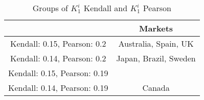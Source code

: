 
\begin{table}[ph]
\centering
\small
\begin{tabular}{ |c|c| }
\hline
& Markets \\
\hline
    Kendall: 0.15, Pearson: 0.2 & Australia, Spain, UK \\ 
 \hline 
Kendall: 0.14, Pearson: 0.2 & Japan, Brazil, Sweden \\ 
 \hline 
Kendall: 0.15, Pearson: 0.19 &  \\ 
 \hline 
Kendall: 0.14, Pearson: 0.19 & Canada \\ 
 \hline 
\end{tabular}
    \caption{Groups of $K_1^i$ Kendall and $K_1^i$ Pearson}
    \end{table}


